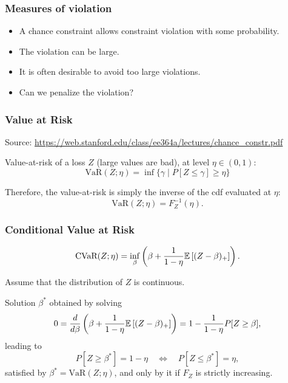\documentclass[aspectratio=169]{beamer}
\begin{document}
\begin{frame}
\frametitle{Measures of violation}

\begin{itemize}
\item 
A chance constraint allows constraint violation with some probability.
\item
The violation can be large.
\item
It is often desirable to avoid too large violations.
\item
Can we penalize the violation?
\end{itemize}

\end{frame}

\begin{frame}
\frametitle{Value at Risk}

Source: \url{https://web.stanford.edu/class/ee364a/lectures/chance_constr.pdf}

\mbox{}

Value-at-risk of a loss $Z$ (large values are bad), at level $\eta \in (0,1)$:
\[
\text{VaR}(Z;\eta) = \inf \{ \gamma \mid P[Z \leq \gamma] \geq \eta \}
\]

\mbox{}

Therefore, the value-at-risk is simply the inverse of the cdf evaluated at $\eta$:
\[
\text{VaR}(Z;\eta) = F_Z^{-1}(\eta).
\]

\end{frame}

\begin{frame}
\frametitle{Conditional Value at Risk}

\[
\text{CVaR}(Z; \eta) = \inf_{\beta} \left( \beta + \frac{1}{1 - \eta} {\mathbb{E}} \left[ (Z - \beta)_+ \right] \right).
\]

\smallskip

Assume that the distribution of $Z$ is continuous.

\smallskip

Solution $\beta^*$ obtained by solving
\[
0 = \frac{d}{d \beta} \left( \beta + \frac{1}{1 - \eta} {\mathbb{E}} \left[ (Z - \beta)_+ \right] \right)
= 1 - \frac{1}{1 - \eta} P[ Z \geq \beta ],
\]
leading to
\[
P[ Z \geq \beta^* ] = 1 - \eta
\quad \Longleftrightarrow \quad P[ Z \leq \beta^* ] = \eta,
\]
satisfied by $\beta^* = \text{VaR}(Z; \eta)$, and only by it if $F_Z$ is strictly increasing.

\end{frame}
\end{document}
